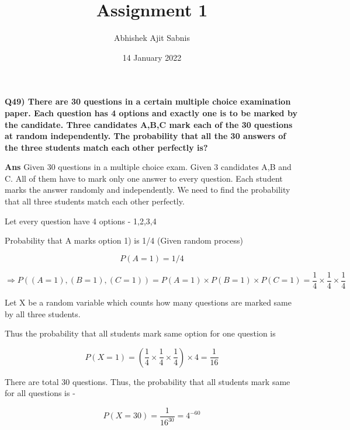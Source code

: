 \documentclass{article}
\title{\textbf{Assignment 1}}
\author{Abhishek Ajit Sabnis}
\date{14 January 2022}
\begin{document}
\maketitle

\textbf{Q49) There are 30 questions in a certain multiple choice examination paper. Each question has 4 options and exactly one is to be marked by the candidate. Three candidates A,B,C mark each of the 30 questions at random independently. The probability that all the 30 answers of the three students match each other perfectly is?}

\vspace{1cm}

\textbf{Ans}  Given 30 questions in a multiple choice exam. Given 3 candidates A,B and C. All of them have to mark only one answer to every question. Each student marks the answer randomly and independently. We need to find the probability that all three students match each other perfectly.

Let every question have 4 options - 1,2,3,4
\vspace{0.5cm}

Probability that A marks option 1) is 1/4 (Given random process)

\begin{equation}
    P(A=1) = 1/4
\end{equation}

\begin{equation}
    \Rightarrow P((A=1) , (B=1) , (C=1)) = P(A=1) \times  P(B=1) \times P(C=1)  
 = \frac{1}{4} \times \frac{1}{4} \times \frac{1}{4}
\end{equation}

Let X be a random variable which counts how many questions are marked same by all three students. 

Thus the probability that all students mark same option for one question is
\vspace{0.5cm}

 
\begin{equation}
    P(X=1) = (\frac{1}{4} \times \frac{1}{4} \times \frac{1}{4}) \times 4 = \frac{1}{16}
\end{equation}

There are total 30 questions. Thus, the probability that all students mark same for all questions is - 

\begin{equation}
     P(X=30) = \frac{1}{16^{30}} = 4^{-60}
\end{equation}
\end{document}
